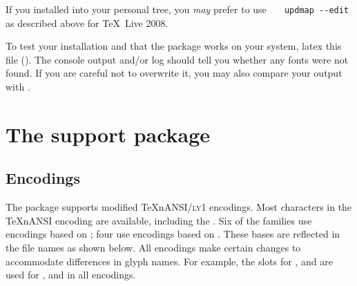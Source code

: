 \documentclass[11pt,british]{article}
\begin{document}
If you installed into your personal tree, you \emph{may} prefer to use \verb|	updmap --edit| as described above for \TeX~Live 2008.

To test your installation and that the package works on your system, latex this file (). The console output and/or log should tell you whether any fonts were not found. If you are careful not to overwrite it, you may also compare your output with .

\section{The support package}\label{sec:support}

\subsection{Encodings}\label{sec:encs}

The package supports modified TeXnANSI/\textsc{ly1} encodings. Most characters in the TeXnANSI encoding are available, including the \texteuro. Six of the families use encodings based on ; four use encodings based on . These bases are reflected in the file names as shown below. All encodings make certain changes to accommodate differences in glyph names. For example, the slots for ,  and  are used for ,  and  in all encodings.
\end{document}
